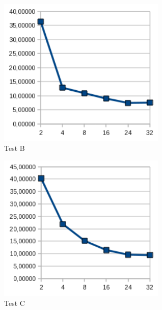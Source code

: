 \documentclass[12pt]{article}
\begin{document}
\begin{figure}[h]
\begin{center}
\includegraphics[width=8cm]{grafy-zprava/testBeth.png}
\caption{Test B}
\label{fig:testBether}
\end{center}
\end{figure}

\begin{figure}[h]
\begin{center}
\includegraphics[width=8cm]{grafy-zprava/testCeth.png}
\caption{Test C}
\label{fig:testCether}
\end{center}
\end{figure}
\end{document}
